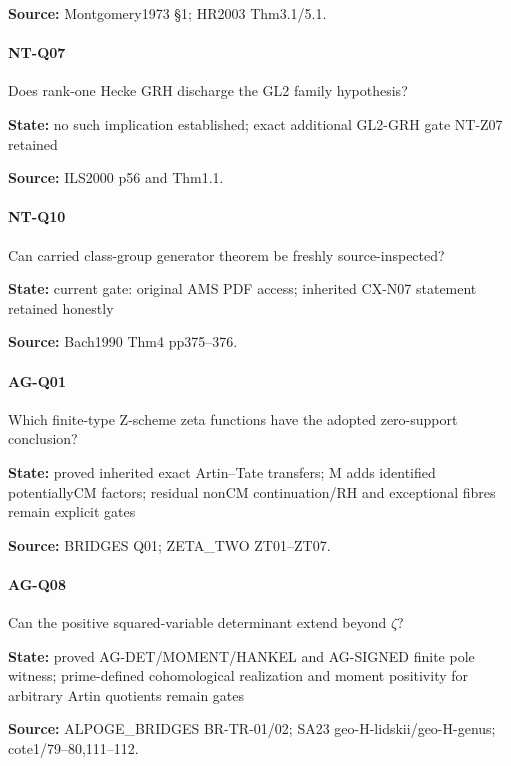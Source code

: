 \documentclass[11pt,a4paper]{article}
\begin{document}
\textbf{Source:} Montgomery1973 §1; HR2003 Thm3.\allowbreak{}1/\allowbreak{}5.\allowbreak{}1.

\paragraph{NT-Q07} Does rank-one Hecke GRH discharge the GL2 family hypothesis?

\textbf{State:} no such implication established; exact additional GL2-GRH gate NT-Z07 retained

\textbf{Source:} ILS2000 p56 and Thm1.\allowbreak{}1.

\paragraph{NT-Q10} Can carried class-group generator theorem be freshly source-inspected?

\textbf{State:} current gate:\allowbreak{} original AMS PDF access; inherited CX-N07 statement retained honestly

\textbf{Source:} Bach1990 Thm4 pp375–\allowbreak{}376.

\paragraph{AG-Q01} Which finite-type Z-scheme zeta functions have the adopted zero-support conclusion?

\textbf{State:} proved inherited exact Artin–\allowbreak{}Tate transfers; M adds identified potentiallyCM factors; residual nonCM continuation/\allowbreak{}RH and exceptional fibres remain explicit gates

\textbf{Source:} BRIDGES Q01; ZETA\_\allowbreak{}TWO ZT01–\allowbreak{}ZT07.

\paragraph{AG-Q08} Can the positive squared-variable determinant extend beyond \ensuremath{\zeta}?

\textbf{State:} proved AG-DET/\allowbreak{}MOMENT/\allowbreak{}HANKEL and AG-SIGNED finite pole witness; prime-defined cohomological realization and moment positivity for arbitrary Artin quotients remain gates

\textbf{Source:} ALPOGE\_\allowbreak{}BRIDGES BR-TR-01/\allowbreak{}02; SA23 geo-H-lidskii/\allowbreak{}geo-H-genus; cote1/\allowbreak{}79–\allowbreak{}80,111–\allowbreak{}112.
\end{document}
